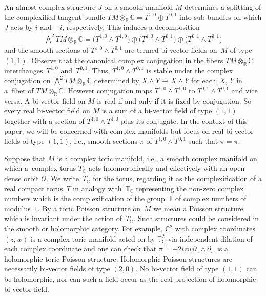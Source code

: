 \documentclass[pdftex]{sigma}
\numberwithin{equation}{section}
\begin{document}
An almost complex structure $J$ on a smooth manifold $M$ determines a splitting of the complexif\/ied tangent bundle $TM\otimes_{\mathbb R} {\mathbb C}=T^{1,0}\oplus T^{0,1}$ into sub-bundles on which $J$ acts by $i$ and $-i$, respectively. This induces a decomposition
\begin{gather*}
\textstyle{\bigwedge^2} TM\otimes_{\mathbb R}{\mathbb C}=\big(T^{1,0}\wedge T^{1,0}\big)\oplus \big(T^{1,0} \wedge T^{0,1}\big)\oplus \big(T^{0,1}\wedge T^{0,1}\big)
\end{gather*}
and the smooth sections of $T^{1,0} \wedge T^{0,1}$ are termed bi-vector f\/ields on~$M$ of type~$(1,1)$. Observe that the canonical complex conjugation in the f\/ibers $TM\otimes_{\mathbb R} {\mathbb C}$ interchanges~$T^{1,0}$ and~$T^{0,1}$. Thus, $T^{1,0} \wedge T^{0,1}$ is stable under the complex conjugation on $\bigwedge^2 TM\otimes_{\mathbb R}{\mathbb C}$ determined by $X\wedge Y\mapsto \overline{X}\wedge \overline{Y}$ for each~$X$, $Y$ in a~f\/iber of $TM\otimes_{\mathbb R} {\mathbb C}$. However conjugation maps $T^{1,0}\wedge T^{1,0}$ to $T^{0,1}\wedge T^{0,1}$ and vice versa. A bi-vector f\/ield on $M$ is real if and only if it is f\/ixed by conjugation. So every real bi-vector f\/ield on $M$ is a sum of a bi-vector f\/ield of type $(1,1)$ together with a section of $T^{1,0}\wedge T^{1,0}$ plus its conjugate. In the context of this paper, we will be concerned with complex manifolds but focus on real bi-vector f\/ields of type $(1,1)$, i.e., smooth sections $\pi$ of $T^{1,0} \wedge T^{0,1}$ such that $\overline{\pi}=\pi$.

Suppose that $M$ is a complex toric manifold, i.e., a smooth complex manifold on which a~complex torus $T_{\mathbb C}$ acts holomorphically and ef\/fectively with an open dense orbit $\mathcal O$. We write~$T_{\mathbb C}$ for the torus, regarding it as the complexif\/ication of a real compact torus~$T$ in analogy with~${\mathbb T}_{\mathbb C}$ representing the non-zero complex numbers which is the complexif\/ication of the group~${\mathbb T}$ of complex numbers of modulus~$1$. By a toric Poisson structure on~$M$ we mean a Poisson structure which is invariant under the action of~$T_{\mathbb C}$. Such structures could be considered in the smooth or holomorphic category. For example, ${\mathbb C}^2$ with complex coordinates $(z,w)$ is a complex toric manifold acted on by ${\mathbb T}_{\mathbb C}^2$ via independent dilation of each complex coordinate and one can check that $\pi=-2izw\partial_z\wedge \partial_w$ is a holomorphic toric Poisson structure. Holomorphic Poisson structures are necessarily bi-vector f\/ields of type $(2,0)$. No bi-vector f\/ield of type $(1,1)$ can be holomorphic, nor can such a f\/ield occur as the real projection of holomorphic bi-vector f\/ield.
\end{document}
